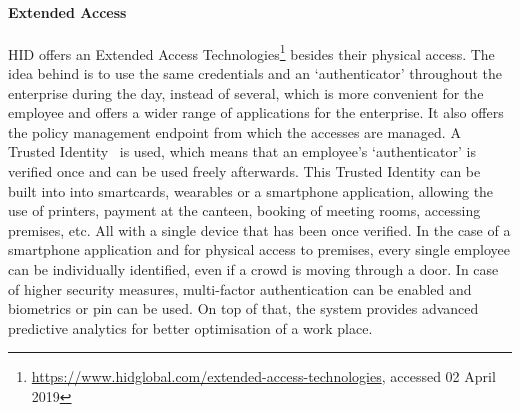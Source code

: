 \paragraph{Extended Access}
HID offers an Extended Access Technologies\footnote{\url{ https://www.hidglobal.com/extended-access-technologies}, accessed 02 April 2019} besides their physical access. The idea behind is to use the same credentials and an `authenticator' throughout the enterprise during the day, instead of several, which is more convenient for the employee and offers a wider range of applications for the enterprise. It also offers the policy management endpoint from which the accesses are managed. A Trusted Identity~\cite{2018ExperiencingPredictive} is used, which means that an employee’s ‘authenticator’ is verified once and can be used freely afterwards. This Trusted Identity can be built into into smartcards, wearables or a smartphone application, allowing the use of printers, payment at the canteen, booking of meeting rooms, accessing premises, etc. All with a single device that has been once verified. In the case of a smartphone application and for physical access to premises, every single employee can be individually identified, even if a crowd is moving through a door. In case of higher security measures, multi-factor authentication can be enabled and biometrics or \acrshort{pin} can be used. On top of that, the system provides advanced predictive analytics for better optimisation of a work place. 
